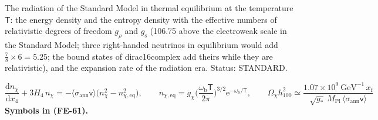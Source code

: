 \documentclass[
  10pt,
]{article}
\begin{document}
The radiation of the Standard Model in thermal equilibrium at the
temperature \(\mathsf{T}\): the energy density and the entropy density
with the effective numbers of relativistic degrees of freedom \(g_\rho\)
and \(g_{\mathrm{s}}\) (106.75 above the electroweak scale in the
Standard Model; three right-handed neutrinos in equilibrium would add
\(\frac78\times6 = 5.25\); the bound states of dirac16complex add theirs
while they are relativistic), and the expansion rate of the radiation
era. Status: STANDARD.

\[
\frac{\mathrm{d}n_\chi}{\mathrm{d}x_4} + 3H_4\,n_\chi = -\langle\sigma_{\mathrm{ann}}\mathsf{v}\rangle\big(n_\chi^2 - n_{\chi,\mathrm{eq}}^2\big),\qquad
n_{\chi,\mathrm{eq}} = g_\chi\Big(\frac{\omega_{\mathrm{b}}\mathsf{T}}{2\pi}\Big)^{3/2}\mathrm{e}^{-\omega_{\mathrm{b}}/\mathsf{T}},\qquad
\Omega_\chi h_{100}^2 \simeq \frac{1.07\times10^9\ \text{GeV}^{-1}\,x_{\mathrm{f}}}{\sqrt{g_*}\,M_{\mathrm{Pl}}\,\langle\sigma_{\mathrm{ann}}\mathsf{v}\rangle} \tag{FE-61}
\] \textbf{Symbols in (FE-61).}
\end{document}
